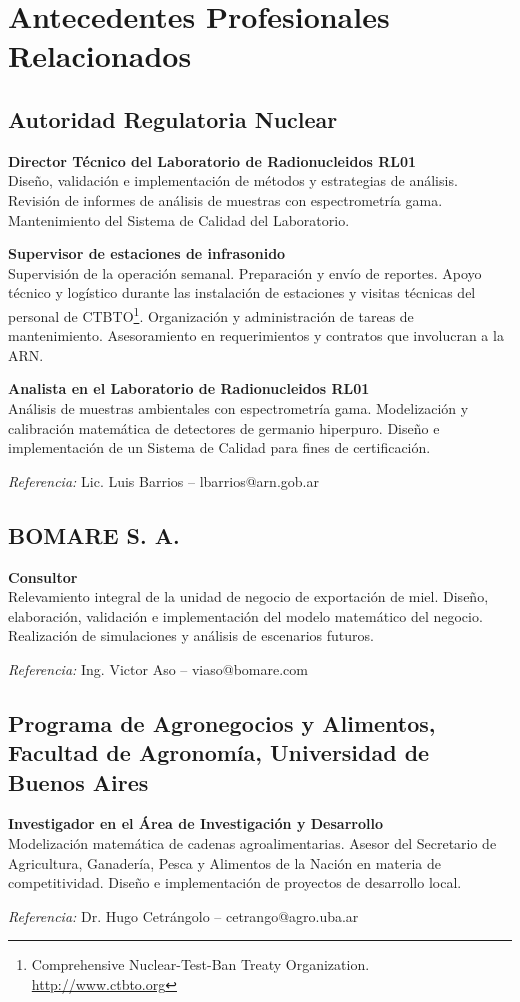 \section{Antecedentes Profesionales Relacionados}

\subsection{Autoridad Regulatoria Nuclear}

  \textbf{Director Técnico del Laboratorio de Radionucleidos RL01} \\
  Diseño, validación e implementación de métodos y estrategias de análisis. Revisión de informes de análisis de muestras con espectrometría gama. Mantenimiento del Sistema de Calidad del Laboratorio.
 
  \textbf{Supervisor de estaciones de infrasonido} \\
 Supervisión de la operación semanal. Preparación y envío de reportes. Apoyo técnico y logístico durante las instalación de estaciones y visitas técnicas del personal de CTBTO\footnote{Comprehensive Nuclear-Test-Ban Treaty Organization. \href{http://www.ctbto.org}{http://www.ctbto.org}}. Organización y administración de tareas de mantenimiento. Asesoramiento en requerimientos y contratos que involucran a la ARN.

  \textbf{Analista en el Laboratorio de Radionucleidos RL01} \\
 Análisis de muestras ambientales con espectrometría gama. Modelización y calibración matemática de detectores de germanio hiperpuro. Diseño e implementación de un Sistema de Calidad para fines de certificación.

 \textit{Referencia:} Lic. Luis Barrios -- lbarrios@arn.gob.ar

\subsection{BOMARE S. A.}
  \textbf{Consultor} \\
 Relevamiento integral de la unidad de negocio de exportación de miel. Diseño, elaboración, validación e implementación del modelo matemático del negocio. Realización de simulaciones y análisis de escenarios futuros.

 \textit{Referencia:} Ing. Victor Aso -- viaso@bomare.com

\subsection{Programa de Agronegocios y Alimentos, Facultad de Agronomía, Universidad de Buenos Aires}

 \textbf{Investigador en el Área de Investigación y Desarrollo} \\
Modelización matemática de cadenas agroalimentarias. Asesor del Secretario de Agricultura, Ganadería, Pesca y Alimentos de la Nación en materia de competitividad. Diseño e implementación de proyectos de desarrollo local.

\textit{Referencia:} Dr. Hugo Cetrángolo -- cetrango@agro.uba.ar
